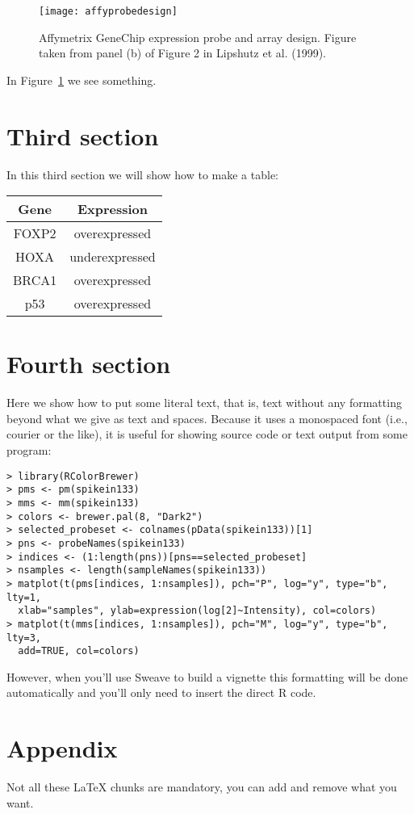 \documentclass{article}
\begin{document}
\begin{figure}[ht]
\centerline{\texttt{[image: affyprobedesign]}}
\caption{Affymetrix GeneChip expression probe and array design.
         Figure taken from panel (b) of Figure 2 in Lipshutz et al. (1999).}
\label{fig:affy}
\end{figure}

In Figure~\ref{fig:affy} we see something.

\section{Third section}

In this third section we will show how to make a table:

\begin{center}
\begin{tabular}{||c|c||} \hline
  {\bf Gene} & {\bf Expression} \\ \hline\hline
  FOXP2 & overexpressed \\ \hline
  HOXA & underexpressed \\ \hline
  BRCA1 & overexpressed \\ \hline
  p53 & overexpressed \\ \hline\hline
\end{tabular}
\end{center}

\section{Fourth section}

Here we show how to put some literal text, that is, text without any
formatting beyond what we give as text and spaces. Because it uses a
monospaced font (i.e., courier or the like), it is useful for showing
source code or text output from some program:

\begin{verbatim}
> library(RColorBrewer)
> pms <- pm(spikein133)
> mms <- mm(spikein133)
> colors <- brewer.pal(8, "Dark2")
> selected_probeset <- colnames(pData(spikein133))[1]
> pns <- probeNames(spikein133)
> indices <- (1:length(pns))[pns==selected_probeset]
> nsamples <- length(sampleNames(spikein133))
> matplot(t(pms[indices, 1:nsamples]), pch="P", log="y", type="b", lty=1,
  xlab="samples", ylab=expression(log[2]~Intensity), col=colors)
> matplot(t(mms[indices, 1:nsamples]), pch="M", log="y", type="b", lty=3,
  add=TRUE, col=colors)
\end{verbatim}

However, when you'll use Sweave to build a vignette this formatting will
be done automatically and you'll only need to insert the direct R code.

\section*{Appendix} %

Not all these LaTeX chunks are mandatory, you can add and remove what
you want.
\end{document}
